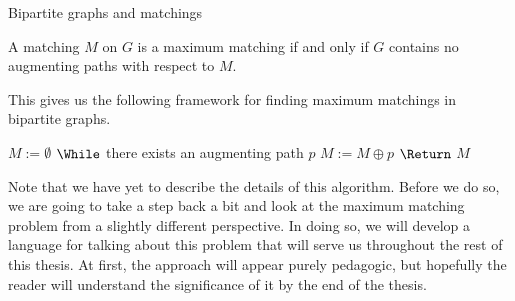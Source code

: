 \documentclass[11pt]{article}
\renewcommand{\'}{^{'}}
\renewcommand{\gets}{:=}
\newenvironment{theorem}[2][Theorem]{\begin{trivlist}
\item[\hskip \labelsep {\bfseries #1}\hskip \labelsep {\bfseries #2.}]}{\end{trivlist}}
\begin{document}
\begin{section}{Bipartite graphs and matchings}
	\begin{theorem}{(Berge, 1957)}
		A matching $M$ on $G$ is a maximum matching if and only if $G$ contains no augmenting 
		paths with respect to $M$.
	\end{theorem}
	This gives us the following framework for finding maximum matchings in bipartite graphs.
	\singlespace
	\begin{codebox}
		\li $M \gets \emptyset $
		\li $\While$ there exists an augmenting path $p$
			\Do
		\li		$M \gets M\oplus p$
			\End
		\li $\Return$ $M$
	\end{codebox}
	\doublespacing
	Note that we have yet to describe the details of this algorithm. Before we do so, we are going 
	to take a step back a bit and look at the maximum matching problem from a slightly different 
	perspective. In doing so, we will develop a language for talking about this problem that will 
	serve us throughout the rest of this thesis. At first, the approach will appear purely 
	pedagogic, but hopefully the reader will understand the significance of it by the end of the 
	thesis.

\end{section}
\end{document}
